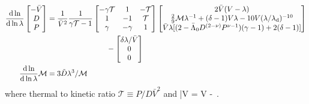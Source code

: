 \begin{align}
\label{eq:selfsim-sph_hydro-mat-gaso-ch:ssr}
\begin{split}
\frac{{\rm d} \ln}{{\rm d} \ln \lambda}
\begin{bmatrix}
 -\bar{V}\\
 D\\
 P
\end{bmatrix} &= \frac{1}{\bar{V}^2} \frac{1}{\gamma \mathcal{T}-1}
\begin{bmatrix}
-\gamma \mathcal{T} & 1 & -\mathcal{T}\\
1 & -1 & \mathcal{T}\\
\gamma & -\gamma & 1
\end{bmatrix} \begin{bmatrix}
 2 \bar{V} (V-\lambda) \\
\frac{2}{9} \mathcal{M} \lambda^{-1} + (\delta -1 ) V \lambda - 10V(\lambda/\lambda_{\rm d})^{-10} \\
 \bar{V} \lambda [(2-\Bar{\Lambda}_0 D^{(2-\nu)} P^{\nu-1})(\gamma - 1) + 2(\delta -1)]
\end{bmatrix} \\
 &\qquad \qquad \qquad  \qquad  -\begin{bmatrix}
\delta \lambda/ \bar{V}\\
0\\
0\\
\end{bmatrix}\\
\frac{{\rm d} \ln}{{\rm d} \ln \lambda} \mathcal{M} &= 3 \tilde{D} \lambda^{3} /  \mathcal{M}
\end{split}
\end{align}
where thermal to kinetic ratio $\mathcal{T} \equiv P / D\bar{V}^2$ and 
\be
\bar{V} \equiv \frac{\der \lambda}{\der \xi} = V - \delta \lambda\,.
\label{eq:Vbar-def-ch:ssr}
\ee




